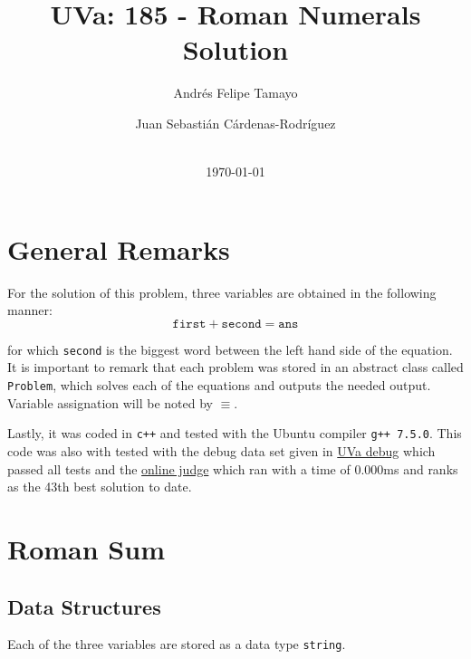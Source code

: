\documentclass[11pt]{article}
\title{UVa: 185 - Roman Numerals Solution}
\author{Andrés Felipe Tamayo \\
  \scalebox{0.7}{aftamayoa@eafit.edu.co} \and
  Juan Sebasti\'an C\'ardenas-Rodríguez \\
  \scalebox{0.7}{jscardenar@eafit.edu.co}}
\date{\scalebox{0.7}{Mathematical Engineering, Universidad EAFIT} \\[2ex]
  \today}
\theoremstyle{definition}
\theoremstyle{remark}
\theoremstyle{remark}
\begin{document}
\maketitle

\section{General Remarks}
For the solution of this problem, three variables are obtained in the following
manner:
\begin{equation*}
  \mathtt{first}+\mathtt{second}=\mathtt{ans}
\end{equation*}

for which \texttt{second} is the biggest word between the left hand side of the
equation. It is important to remark that each problem was stored in an abstract
class called \texttt{Problem}, which solves each of the equations and outputs
the needed output. Variable assignation will be noted by $\equiv$.

Lastly, it was coded in \texttt{c++} and tested with the Ubuntu compiler
\texttt{g++ 7.5.0}. This code was also with tested with the debug data set given
in \href{https://www.udebug.com/UVa/185}{UVa debug} which passed all tests and
the \href{https://onlinejudge.org/}{online judge} which ran with a time of
0.000ms and ranks as the 43th best solution to date.

\section{Roman Sum}

\subsection{Data Structures}
Each of the three variables are stored as a data type \texttt{string}.
\end{document}
